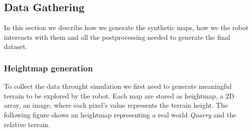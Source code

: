 \documentclass[../document.tex]{subfiles}
\begin{document}
\subsection{Data Gathering}
In this section we describe how we generate the synthetic maps, how we the robot intereacts with them and all the postprocessing needed to generate the final dataset.
\subsubsection{Heightmap generation}
To collect the data throught simulation we first need to generate meaningful terrain to be explored by the robot. Each map are stored as heightmap, a 2D array, an image, where each pixel's value represents the terrain height. The following figure shows an heightmap representing a real world \emph{Quarry} and the relative terrain.
\end{document}
